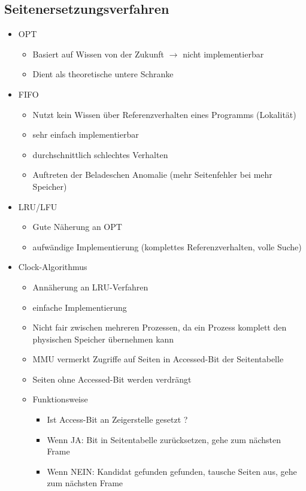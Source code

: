 \documentclass[12pt,a4paper]{article}
\begin{document}
\subsection{Seitenersetzungsverfahren}
\begin{itemize}
\item OPT 
\begin{itemize}
\item Basiert auf Wissen von der Zukunft $\rightarrow$ nicht implementierbar
\item Dient als theoretische untere Schranke
\end{itemize}
\item FIFO
\begin{itemize}
\item Nutzt kein Wissen über Referenzverhalten eines Programms (Lokalität)
\item sehr einfach implementierbar
\item durchschnittlich schlechtes Verhalten
\item Auftreten der Beladeschen Anomalie (mehr Seitenfehler bei mehr Speicher)
\end{itemize}
\item LRU/LFU
\begin{itemize}
\item Gute Näherung an OPT
\item aufwändige Implementierung (komplettes Referenzverhalten, volle Suche)
\end{itemize}
\item Clock-Algorithmus
\begin{itemize}
\item Annäherung an LRU-Verfahren
\item einfache Implementierung
\item Nicht fair zwischen mehreren Prozessen, da ein Prozess komplett den physischen Speicher übernehmen kann
\item MMU vermerkt Zugriffe auf Seiten in Accessed-Bit der Seitentabelle
\item Seiten ohne Accessed-Bit werden verdrängt
\item Funktionsweise
\begin{itemize}
\item Ist Access-Bit an Zeigerstelle gesetzt ?
\item Wenn JA: Bit in Seitentabelle zurücksetzen, gehe zum nächsten Frame
\item Wenn NEIN: Kandidat gefunden gefunden, tausche Seiten aus, gehe zum nächsten Frame
\end{itemize}

\end{itemize}
\end{itemize}
\end{document}
